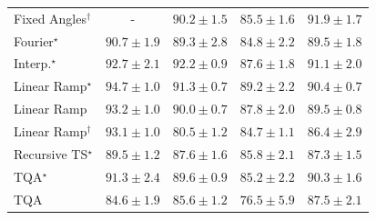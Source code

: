 \begin{tabular}{l|cccc|}
Fixed Angles$^\dagger$ & {\cellcolor[HTML]{000000}} \color[HTML]{F1F1F1} {\cellcolor{white}} \color{black} - & {\cellcolor[HTML]{036B38}} \color[HTML]{F1F1F1} $90.2\pm 1.5$ & {\cellcolor[HTML]{208242}} \color[HTML]{F1F1F1} $85.5\pm 1.6$ & {\cellcolor[HTML]{006034}} \color[HTML]{F1F1F1} $91.9\pm 1.7$ \\
Fourier$^\star$ & {\cellcolor[HTML]{006837}} \color[HTML]{F1F1F1} $90.7\pm 1.9$ & {\cellcolor[HTML]{096F3A}} \color[HTML]{F1F1F1} $89.3\pm 2.8$ & {\cellcolor[HTML]{248644}} \color[HTML]{F1F1F1} $84.8\pm 2.2$ & {\cellcolor[HTML]{086E3A}} \color[HTML]{F1F1F1} $89.5\pm 1.8$ \\
Interp.$^\star$ & {\cellcolor[HTML]{005C32}} \color[HTML]{F1F1F1} $92.7\pm 2.1$ & {\cellcolor[HTML]{005F34}} \color[HTML]{F1F1F1} $92.2\pm 0.9$ & {\cellcolor[HTML]{13773D}} \color[HTML]{F1F1F1} $87.6\pm 1.8$ & {\cellcolor[HTML]{006636}} \color[HTML]{F1F1F1} $91.1\pm 2.0$ \\
Linear Ramp$^\star$ & {\cellcolor[HTML]{00502D}} \color[HTML]{F1F1F1} $94.7\pm 1.0$ & {\cellcolor[HTML]{006536}} \color[HTML]{F1F1F1} $91.3\pm 0.7$ & {\cellcolor[HTML]{096F3A}} \color[HTML]{F1F1F1} $89.2\pm 2.2$ & {\cellcolor[HTML]{026A38}} \color[HTML]{F1F1F1} $90.4\pm 0.7$ \\
Linear Ramp & {\cellcolor[HTML]{005931}} \color[HTML]{F1F1F1} $93.2\pm 1.0$ & {\cellcolor[HTML]{056C39}} \color[HTML]{F1F1F1} $90.0\pm 0.7$ & {\cellcolor[HTML]{12763D}} \color[HTML]{F1F1F1} $87.8\pm 2.0$ & {\cellcolor[HTML]{086E3A}} \color[HTML]{F1F1F1} $89.5\pm 0.8$ \\
Linear Ramp$^\dagger$ & {\cellcolor[HTML]{005A31}} \color[HTML]{F1F1F1} $93.1\pm 1.0$ & {\cellcolor[HTML]{3BA358}} \color[HTML]{F1F1F1} $80.5\pm 1.2$ & {\cellcolor[HTML]{258745}} \color[HTML]{F1F1F1} $84.7\pm 1.1$ & {\cellcolor[HTML]{1A7D40}} \color[HTML]{F1F1F1} $86.4\pm 2.9$ \\
Recursive TS$^\star$ & {\cellcolor[HTML]{086E3A}} \color[HTML]{F1F1F1} $89.5\pm 1.2$ & {\cellcolor[HTML]{13773D}} \color[HTML]{F1F1F1} $87.6\pm 1.6$ & {\cellcolor[HTML]{1F8142}} \color[HTML]{F1F1F1} $85.8\pm 2.1$ & {\cellcolor[HTML]{15793E}} \color[HTML]{F1F1F1} $87.3\pm 1.5$ \\
TQA$^\star$ & {\cellcolor[HTML]{006536}} \color[HTML]{F1F1F1} $91.3\pm 2.4$ & {\cellcolor[HTML]{076D39}} \color[HTML]{F1F1F1} $89.6\pm 0.9$ & {\cellcolor[HTML]{228343}} \color[HTML]{F1F1F1} $85.2\pm 2.2$ & {\cellcolor[HTML]{026A38}} \color[HTML]{F1F1F1} $90.3\pm 1.6$ \\
TQA & {\cellcolor[HTML]{258745}} \color[HTML]{F1F1F1} $84.6\pm 1.9$ & {\cellcolor[HTML]{208242}} \color[HTML]{F1F1F1} $85.6\pm 1.2$ & {\cellcolor[HTML]{5DB96B}} \color[HTML]{F1F1F1} $76.5\pm 5.9$ & {\cellcolor[HTML]{14783E}} \color[HTML]{F1F1F1} $87.5\pm 2.1$ \\

\end{tabular}
